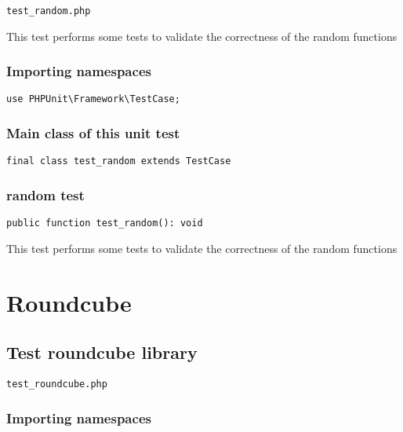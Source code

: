 \documentclass[a4paper]{article}
\begin{document}
\begin{lstlisting}
test_random.php
\end{lstlisting}

This test performs some tests to validate the correctness
of the random functions

\hypertarget{toc347}{}
\subsubsection{Importing namespaces}

\begin{lstlisting}
use PHPUnit\Framework\TestCase;
\end{lstlisting}

\hypertarget{toc348}{}
\subsubsection{Main class of this unit test}

\begin{lstlisting}
final class test_random extends TestCase
\end{lstlisting}

\hypertarget{toc349}{}
\subsubsection{random test}

\begin{lstlisting}
public function test_random(): void
\end{lstlisting}

This test performs some tests to validate the correctness
of the random functions


\hypertarget{toc350}{}
\section{Roundcube}

\hypertarget{toc351}{}
\subsection{Test roundcube library}

\begin{lstlisting}
test_roundcube.php
\end{lstlisting}

\hypertarget{toc352}{}
\subsubsection{Importing namespaces}
\end{document}
